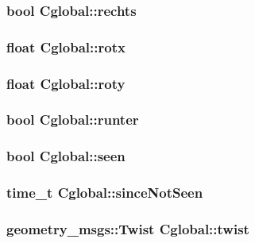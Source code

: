 \hypertarget{class_cglobal_a718da04af5940be1ad811f61b85f57d6}{
\subsubsection[{rechts}]{\setlength{\rightskip}{0pt plus 5cm}bool {\bf Cglobal::rechts}}}
\label{class_cglobal_a718da04af5940be1ad811f61b85f57d6}
\hypertarget{class_cglobal_ad295728f5113d9a47527cf14262dea0e}{
\subsubsection[{rotx}]{\setlength{\rightskip}{0pt plus 5cm}float {\bf Cglobal::rotx}}}
\label{class_cglobal_ad295728f5113d9a47527cf14262dea0e}
\hypertarget{class_cglobal_a5c1fac565d3813e798bd6aeb1c6fc8aa}{
\subsubsection[{roty}]{\setlength{\rightskip}{0pt plus 5cm}float {\bf Cglobal::roty}}}
\label{class_cglobal_a5c1fac565d3813e798bd6aeb1c6fc8aa}
\hypertarget{class_cglobal_a3198b29c259c188b0938b4fb5731409b}{
\subsubsection[{runter}]{\setlength{\rightskip}{0pt plus 5cm}bool {\bf Cglobal::runter}}}
\label{class_cglobal_a3198b29c259c188b0938b4fb5731409b}
\hypertarget{class_cglobal_afe6f01a7ff64a3de6d0c8612f36511fd}{
\subsubsection[{seen}]{\setlength{\rightskip}{0pt plus 5cm}bool {\bf Cglobal::seen}}}
\label{class_cglobal_afe6f01a7ff64a3de6d0c8612f36511fd}
\hypertarget{class_cglobal_abb1e0f2a241a8d9131098cf823b45f64}{
\subsubsection[{sinceNotSeen}]{\setlength{\rightskip}{0pt plus 5cm}time\_\-t {\bf Cglobal::sinceNotSeen}}}
\label{class_cglobal_abb1e0f2a241a8d9131098cf823b45f64}
\hypertarget{class_cglobal_acdd49b2fad30faf04785664c422f5ef7}{
\subsubsection[{twist}]{\setlength{\rightskip}{0pt plus 5cm}geometry\_\-msgs::Twist {\bf Cglobal::twist}}}
\label{class_cglobal_acdd49b2fad30faf04785664c422f5ef7}



